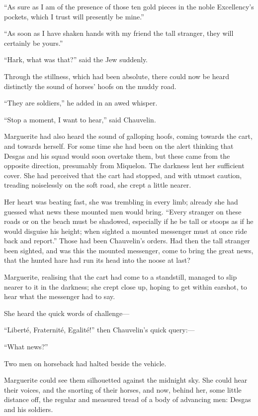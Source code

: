 \documentclass[paper=a5,BCOR=7mm,twoside,DIV=calc,12pt,usegeometry,chapterprefix,endperiod,headings=big]{scrbook}
\begin{document}
\enquote{As sure as I am of the presence of those ten gold pieces in the noble Excellency's pockets, which I trust will presently be mine.}

\enquote{As soon as I have shaken hands with my friend the tall stranger, they will certainly be yours.}

\enquote{Hark, what was that?} said the Jew suddenly.

Through the stillness, which had been absolute, there could now be heard distinctly the sound of horses’ hoofs on the muddy road.

\enquote{They are soldiers,} he added in an awed whisper.

\enquote{Stop a moment, I want to hear,} said Chauvelin.

Marguerite had also heard the sound of galloping hoofs, coming towards the cart, and towards herself. For some time she had been on the alert thinking that Desgas and his squad would soon overtake them, but these came from the opposite direction, presumably from Miquelon. The darkness lent her sufficient cover. She had perceived that the cart had stopped, and with utmost caution, treading noiselessly on the soft road, she crept a little nearer.

Her heart was beating fast, she was trembling in every limb; already she had guessed what news these mounted men would bring. \enquote{Every stranger on these roads or on the beach must be shadowed, especially if he be tall or stoops as if he would disguise his height; when sighted a mounted messenger must at once ride back and report.} Those had been Chauvelin's orders. Had then the tall stranger been sighted, and was this the mounted messenger, come to bring the great news, that the hunted hare had run its head into the noose at last?

Marguerite, realising that the cart had come to a standstill, managed to slip nearer to it in the darkness; she crept close up, hoping to get within earshot, to hear what the messenger had to say.

She heard the quick words of challenge---

\enquote{Liberté, Fraternité, Egalité!} then Chauvelin's quick query:---

\enquote{What news?}

Two men on horseback had halted beside the vehicle.

Marguerite could see them silhouetted against the midnight sky. She could hear their voices, and the snorting of their horses, and now, behind her, some little distance off, the regular and measured tread of a body of advancing men: Desgas and his soldiers.
\end{document}
